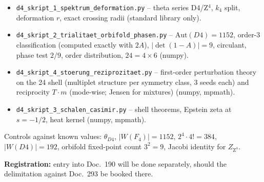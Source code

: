 \begin{itemize}
  \item \texttt{d4\_skript\_1\_spektrum\_deformation.py} --
        theta series D4/Z$^4$, $k_4$ split, deformation $r$, exact
        crossing radii (standard library only).
  \item \texttt{d4\_skript\_2\_trialitaet\_orbifold\_phasen.py} --
        $\text{Aut}(D4) = 1152$, order-3 classification (computed
        exactly with $2A$), $|\det(1-A)| = 9$, circulant, phase test
        $2/9$, order distribution, $24 = 4\times6$ (numpy).
  \item \texttt{d4\_skript\_4\_stoerung\_reziprozitaet.py} --
        first-order perturbation theory on the 24 shell (multiplet
        structure per symmetry class, 3 seeds each) and
        reciprocity $T\cdot m$ (mode-wise; Jensen for mixtures)
        (numpy, mpmath).
  \item \texttt{d4\_skript\_3\_schalen\_casimir.py} --
        shell theorems, Epstein zeta at $s = -1/2$, heat kernel
        (numpy, mpmath).
\end{itemize}

Controls against known values: $\theta_{D4}$, $|W(F_4)| = 1152$,
$2^4\cdot4! = 384$, $|W(D4)| = 192$, orbifold fixed-point count
$3^2 = 9$, Jacobi identity for $Z_{\text{Z}^4}$.

\medskip
\noindent\textbf{Registration:} entry into Doc.~190 will be done
separately, should the delimitation against Doc.~293 be booked
there.


